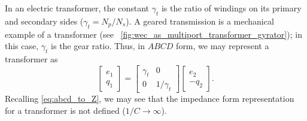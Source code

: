 \documentclass[lettersize,journal]{IEEEtran}
\begin{document}
In an electric transformer, the constant $\gamma_t$ is the ratio of windings on its primary and secondary sides ($\gamma_t=N_p/N_s$).
A geared transmission is a mechanical example of a transformer (see \figurename~\ref{fig:wec_as_multiport_transformer_gyrator}); in this case, $\gamma_{t}$ is the gear ratio.
Thus, in $ABCD$ form, we may represent a transformer as
%
\begin{equation}
        \begin{bmatrix}
                e_1 \\ q_1
        \end{bmatrix}
        =
        \begin{bmatrix}
                \gamma_{t} & 0 \\ 0 & 1/\gamma_{t}
        \end{bmatrix}
        \begin{bmatrix}
                e_2 \\ - q_2
        \end{bmatrix} .
        \label{eq:transformer_abcd}
\end{equation}
%
Recalling \eqref{eq:abcd_to_Z}, we may see that the impedance form representation for a transformer is not defined ($1/C \rightarrow \infty$).

\end{document}

